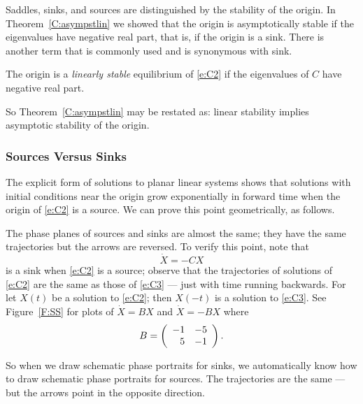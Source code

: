 \documentclass{ximera}
\begin{document}
Saddles, sinks, and sources are distinguished by the stability of the
origin.  In Theorem~\ref{C:asympstlin} we showed that the origin is
asymptotically stable if the eigenvalues have negative real part, that is,
if the origin is a sink.  There is another term that is commonly used and
is synonymous with sink.
\begin{definition} \label{D:linstablin}
The origin is a {\em linearly stable\/} equilibrium of \eqref{e:C2} if the
eigenvalues of $C$ have negative real part.
\end{definition}
So Theorem~\ref{C:asympstlin} may be restated as: linear stability
implies asymptotic stability of the origin.

\subsubsection*{Sources Versus Sinks}

The explicit form of solutions to planar linear systems shows that solutions
with initial conditions near the origin grow exponentially in forward time
when the origin of \eqref{e:C2} is a source.  We can prove this point
geometrically, as follows.

The phase planes of sources and sinks are almost the same; they have the
same trajectories but the arrows are reversed.  To verify this point, note
that
\begin{equation}  \label{e:C3}
\dot{X}=-CX
\end{equation}
is a sink when \eqref{e:C2} is a source; observe that the trajectories of
solutions of \eqref{e:C2} are the same as those of \eqref{e:C3} --- just with
time running backwards.  For let $X(t)$ be a solution to \eqref{e:C2}; then
$X(-t)$ is a solution to \eqref{e:C3}.   See Figure~\ref{F:SS} for plots of
$\dot{X}=BX$ and $\dot{X}=-BX$ where
\begin{equation}  \label{E:SS}
B = \left(\begin{array}{rr} -1 & -5\\ 5 &-1\end{array}\right).
\end{equation}

So when we draw schematic phase portraits
for sinks, we automatically know
how to draw schematic phase portraits for
sources.  The trajectories are
the same --- but the arrows point in the opposite direction.

\begin{figure*}[htb]
           \centerline{%
           }
           \caption{(Left) Sink $\dot{X}=BX$ where $B$ is given in
\protect{\eqref{E:SS}}.  (Right) Source $\dot{X}=-BX$.}
           \label{F:SS}
\end{figure*}
\end{document}

